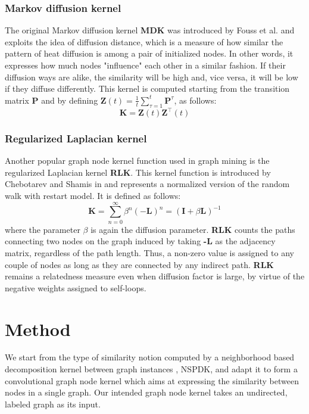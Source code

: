 \documentclass[review]{elsarticle}
\begin{document}
\subsubsection{Markov diffusion kernel}
The original Markov diffusion kernel \textbf{MDK} was introduced by Fouss et al. \cite{fouss2006experimental} and exploits the idea of diffusion distance, which is a measure of how similar the pattern of heat diffusion is among a pair of initialized nodes. In other words, it expresses how much nodes "influence" each other in a similar fashion. If their diffusion ways are alike, the similarity will be high and, vice versa, it will be low if they diffuse differently. This kernel is computed starting from the transition matrix \textbf{P} and by defining $\textbf{Z}(t) = \frac{1}{t}\sum_{\tau=1}^{t}\textbf{P}^{\tau}$, as follows:
\begin{equation} 
\label{MDK-formula}
\textbf{K} = \textbf{Z}(t)\textbf{Z}^{\top}(t)
\end{equation}

\subsubsection{Regularized Laplacian kernel}
Another popular graph node kernel function used in graph mining is the regularized Laplacian kernel \textbf{RLK}. This kernel function is introduced by Chebotarev and Shamis in \cite{chebotarev2006matrix} and represents a normalized version of the random walk with restart model. It is defined as follows:
\begin{equation} 
\label{RLK-formula}
\textbf{K} = \sum_{n=0}^{\infty}\beta^{n}(-\textbf{L})^n = (\textbf{I} + \beta \textbf{L})^{-1}
\end{equation}
where the parameter $\beta$ is again the diffusion parameter. \textbf{RLK} counts the paths connecting two nodes on the graph induced by taking \textbf{-L} as the adjacency matrix, regardless of the path length. Thus, a non-zero value is assigned to any couple of nodes as long as they are connected by any indirect path. \textbf{RLK} remains a relatedness measure even when diffusion factor is large, by virtue of the negative weights assigned to self-loops.

\section{Method}
We start from the type of similarity notion computed by a neighborhood based decomposition kernel between graph instances \cite{costa2010fast}, NSPDK, and adapt it to form a convolutional graph node kernel which aims at expressing the similarity between nodes in a single graph. Our intended graph node kernel takes an undirected, labeled graph as its input.
\end{document}

